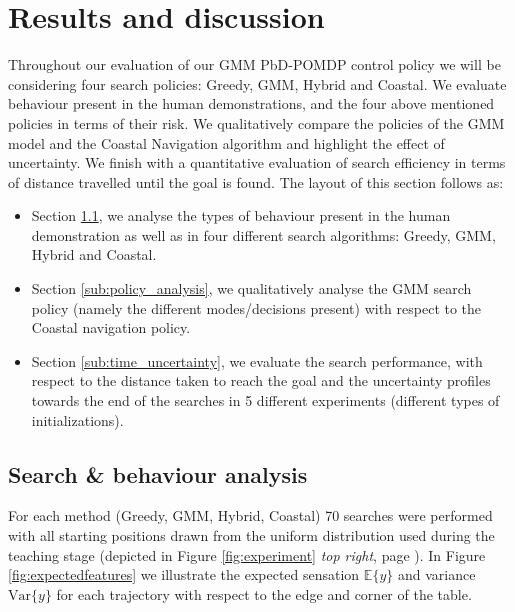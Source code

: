 \section{Results and discussion}\label{chap3:results}

Throughout our evaluation of our GMM PbD-POMDP control policy we will be considering four search policies: Greedy, GMM, Hybrid and 
Coastal. We evaluate behaviour present in the human demonstrations, and the four above mentioned policies in terms 
of their risk. We qualitatively compare the policies of the GMM model and the Coastal Navigation algorithm and highlight the 
effect of uncertainty. We finish with a quantitative evaluation of search efficiency in terms of distance travelled until the goal is found.
The layout of this section follows as:
\begin{itemize}
 \item Section \ref{sub:search_behaviour}, we analyse the types of behaviour present in the human demonstration as well as in
four different search algorithms: Greedy, GMM, Hybrid and Coastal.
 \item Section \ref{sub:policy_analysis}, we qualitatively analyse the GMM search policy (namely the different modes/decisions present) 
 with respect to the Coastal navigation policy.
 \item Section \ref{sub:time_uncertainty}, we evaluate the search performance, with respect to the distance taken to reach the goal and the uncertainty profiles towards the end of 
the searches in 5 different experiments (different types of initializations). 
\end{itemize}
\FloatBarrier
\subsection{Search \& behaviour analysis}\label{sub:search_behaviour}

For each method (Greedy, GMM, Hybrid, Coastal) 70 searches were performed with all starting positions drawn from the
uniform distribution used during the teaching stage (depicted in Figure \ref{fig:experiment} \textit{top right}, page \pageref{fig:experiment}). 
In Figure \ref{fig:expectedfeatures} we illustrate the expected sensation $\mathbb{E}\{y\}$ and  variance $\mathrm{Var}\{y\}$ for each trajectory with respect 
to the edge and corner of the table. 

